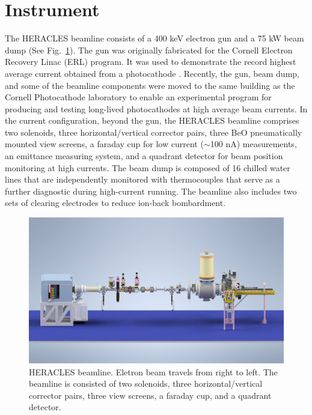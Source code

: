 \section{Instrument}
The HERACLES beamline consists of a 400 keV electron gun and a 75 kW beam dump (See Fig.~\ref{fig_heracles}). The gun was originally fabricated for the Cornell Electron Recovery Linac (ERL) program. It was used to demonstrate the record highest average current obtained from a photocathode \cite{dunham2013_RecordHighaverageCurrent}. Recently, the gun, beam dump, and some of the beamline components were moved to the same building as the Cornell Photocathode laboratory to enable an experimental program for producing and testing long-lived photocathodes at high average beam currents.
In the current configuration, beyond the gun, the HERACLES beamline comprises two solenoids, three horizontal/vertical corrector pairs, three BeO pneumatically mounted view screens, a faraday cup for low current ($\sim$100 nA) measurements, an emittance measuring system, and a quadrant detector for beam position monitoring at high currents. The beam dump is composed of 16 chilled water lines that are independently monitored with thermocouples that serve as a further diagnostic during high-current running. The beamline also includes two sets of clearing electrodes to reduce ion-back bombardment.

\begin{figure}
	\centering
	\includegraphics*[width=400pt]{figs/heracles/heracles.png}
	\caption{HERACLES beamline. Eletron beam travels from right to left. The beamline is consisted of two solenoids, three horizontal/vertical corrector pairs, three view screens, a faraday cup, and a quadrant detector.}
	\label{fig_heracles}
\end{figure}

